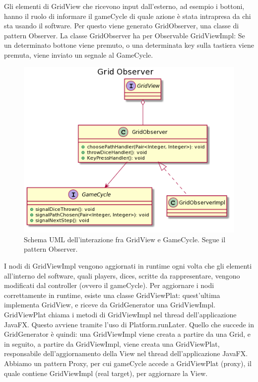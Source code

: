 \documentclass[a4paper,12pt]{report}
\begin{document}
	Gli elementi di GridView che ricevono input dall’esterno, ad esempio i bottoni, hanno il ruolo di informare il gameCycle di quale azione è stata intrapresa da chi sta usando il software.
	Per questo viene generato GridObserver, una classe di pattern Observer.
	La classe GridObserver ha per Observable GridViewImpl: Se un determinato bottone viene premuto, o una determinata key sulla tastiera viene premuta, viene inviato un segnale al GameCycle.

	\begin{figure}[h]
	\centering{}
	\includegraphics[width=\textwidth]{images/miriana/grid_observer.png}
	\caption{Schema UML dell'interazione fra GridView e GameCycle. Segue il pattern Observer.}
	\label{img:gridobserver}
	\end{figure}

	I nodi di GridViewImpl vengono aggiornati in runtime ogni volta che gli elementi all’interno del software, quali players, dices, scritte da rappresentare, vengono modificati dal controller (ovvero il gameCycle).
	Per aggiornare i nodi correttamente in runtime, esiste una classe GridViewPlat: quest'ultima implementa GridView, e riceve da GridGenerator una GridViewImpl.
	GridViewPlat chiama i metodi di GridViewImpl nel thread dell’applicazione JavaFX.
	Questo avviene tramite l’uso di Platform.runLater.
	Quello che succede in GridGenerator è quindi: una GridViewImpl viene creata a partire da una Grid, e in seguito, a partire da GridViewImpl, viene creata una GridViewPlat, responsabile dell’aggiornamento della View nel thread dell’applicazione JavaFX.
	Abbiamo un pattern Proxy, per cui gameCycle accede a GridViewPlat (proxy), il quale contiene GridViewImpl (real target), per aggiornare la View.
\end{document}
